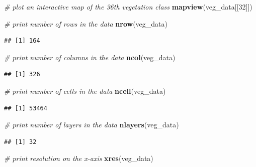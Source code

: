 \documentclass[12pt,]{book}
\newenvironment{Shaded}{\begin{snugshade}}{\end{snugshade}}
\newcommand{\CommentTok}[1]{\textcolor[rgb]{0.56,0.35,0.01}{\textit{#1}}}
\newcommand{\DecValTok}[1]{\textcolor[rgb]{0.00,0.00,0.81}{#1}}
\newcommand{\KeywordTok}[1]{\textcolor[rgb]{0.13,0.29,0.53}{\textbf{#1}}}
\newcommand{\NormalTok}[1]{#1}
\begin{document}
\begin{Shaded}
\begin{Highlighting}[]
\CommentTok{# plot an interactive map of the 36th vegetation class}
\KeywordTok{mapview}\NormalTok{(veg_data[[}\DecValTok{32}\NormalTok{]])}
\end{Highlighting}
\end{Shaded}

\begin{Shaded}
\begin{Highlighting}[]
\CommentTok{# print number of rows in the data}
\KeywordTok{nrow}\NormalTok{(veg_data)}
\end{Highlighting}
\end{Shaded}

\begin{verbatim}
## [1] 164
\end{verbatim}

\begin{Shaded}
\begin{Highlighting}[]
\CommentTok{# print number of columns  in the data}
\KeywordTok{ncol}\NormalTok{(veg_data)}
\end{Highlighting}
\end{Shaded}

\begin{verbatim}
## [1] 326
\end{verbatim}

\begin{Shaded}
\begin{Highlighting}[]
\CommentTok{# print number of cells in the data}
\KeywordTok{ncell}\NormalTok{(veg_data)}
\end{Highlighting}
\end{Shaded}

\begin{verbatim}
## [1] 53464
\end{verbatim}

\begin{Shaded}
\begin{Highlighting}[]
\CommentTok{# print number of layers in the data}
\KeywordTok{nlayers}\NormalTok{(veg_data)}
\end{Highlighting}
\end{Shaded}

\begin{verbatim}
## [1] 32
\end{verbatim}

\begin{Shaded}
\begin{Highlighting}[]
\CommentTok{# print  resolution on the x-axis}
\KeywordTok{xres}\NormalTok{(veg_data)}
\end{Highlighting}
\end{Shaded}
\end{document}
